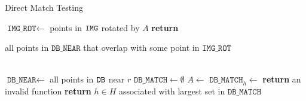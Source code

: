 \begin{algorithm}
	\caption{Direct Match Testing} \label{algorithm:dmt}
	\begin{algorithmic}[1]
		\State $\texttt{IMG\_ROT} \gets$ points in $\texttt{IMG}$ rotated by $A$
		\State \textbf{return} \parbox[t]{0.8\linewidth}{\raggedright all points in $\texttt{DB\_NEAR}$ that overlap with some point in $\texttt{IMG\_ROT}$}
		\EndFunction
		\\
        \State $\texttt{DB\_NEAR} \gets $ all points in $\texttt{DB}$ near $r$
        \State $\texttt{DB\_MATCH} \gets \emptyset$
        \State $A \gets $ 
        \State $\texttt{DB\_MATCH}_h \gets $ 
        \EndFor
        \State \textbf{return} an invalid function %
        \Else
        \State \textbf{return} $h \in H$ associated with largest set in $\texttt{DB\_MATCH}$
        \EndIf
        \EndFunction
	\end{algorithmic}
\end{algorithm}

